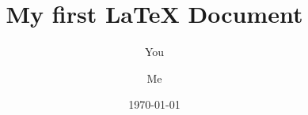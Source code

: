\documentclass[a4paper]{article}
\begin{document}
\title{My first LaTeX Document}
\author{You \and Me}
\date{\today}
\maketitle 
\end{document}
